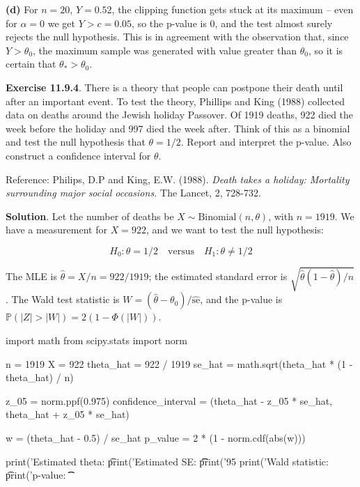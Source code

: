 \textbf{(d)} For \(n = 20\), \(Y = 0.52\), the clipping function gets
stuck at its maximum -- even for \(\alpha = 0\) we get \(Y > c = 0.05\),
so the p-value is 0, and the test almost surely rejects the null
hypothesis. This is in agreement with the observation that, since
\(Y > \theta_{0}\), the maximum sample was generated with value greater
than \(\theta_{0}\), so it is certain that \(\theta_* > \theta_{0}\).

\textbf{Exercise 11.9.4}. There is a theory that people can postpone
their death until after an important event. To test the theory, Phillips
and King (1988) collected data on deaths around the Jewish holiday
Passover. Of 1919 deaths, 922 died the week before the holiday and 997
died the week after. Think of this as a binomial and test the null
hypothesis that \(\theta = 1/2\). Report and interpret the p-value. Also
construct a confidence interval for \(\theta\).

Reference: Philips, D.P and King, E.W. (1988). \emph{Death takes a
holiday: Mortality surrounding major social occasions.} The Lancet, 2,
728-732.

\textbf{Solution}. Let the number of deaths be
\(X \sim \text{Binomial}(n, \theta)\), with \(n = 1919\). We have a
measurement for \(X = 922\), and we want to test the null hypothesis:

\[H_{0}:  \theta = 1/2 \quad \text{versus} \quad H_{1}: \theta \neq 1/2\]

The MLE is \(\hat{\theta} = X / n = 922 / 1919\); the estimated standard
error is \(\sqrt{\hat{\theta}(1 - \hat{\theta})/n}\). The Wald test
statistic is \(W = (\hat{\theta} - \theta_{0}) / \hat{\text{se}}\), and
the p-value is \(\mathbb{P}(|Z| > |W|) = 2(1 - \Phi(|W|))\).

\begin{python}
import math
from scipy.stats import norm

n = 1919
X = 922
theta_hat = 922 / 1919
se_hat = math.sqrt(theta_hat * (1 - theta_hat) / n)

z_{0}5 = norm.ppf(0.975)
confidence_{i}nterval = (theta_hat - z_{0}5 * se_hat, theta_hat + z_{0}5 * se_hat)

w = (theta_hat - 0.5) / se_hat
p_value = 2 * (1 - norm.cdf(abs(w)))

print('Estimated theta: \t %
print('Estimated SE: \t\t %
print('95%
print('Wald statistic: \t %
print('p-value: \t\t %
\end{python}

